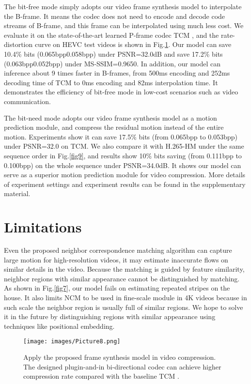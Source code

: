\documentclass[sigconf]{acmart}
\begin{document}
The bit-free mode simply adopts our video frame synthesis model to interpolate the B-frame. It means the codec does not need to encode and decode code streams of B-frame, and this frame can be interpolated using much less cost. We evaluate it on the state-of-the-art learned P-frame codec TCM  \cite{sheng2021temporal}, and the rate-distortion curve on HEVC test videos \cite{sullivan2012overview} is shown in Fig.\ref{fig8}. Our model can save 10.4\% bits (0.065bpp0.058bpp) under PSNR=32.0dB and save 17.2\% bits (0.063bpp0.052bpp) under MS-SSIM=0.9650. In addition, our model can inference about 9 times faster in B-frames, from 500ms encoding and 252ms decoding time of TCM to 0ms encoding and 82ms interpolation time. It demonstrates the efficiency of bit-free mode in low-cost scenarios such as video communication.

The bit-need mode adopts our video frame synthesis model as a motion prediction module, and compress the residual motion instead of the entire motion. Experiments show it can save 17.5\% bits (from 0.065bpp to 0.053bpp) under PSNR=32.0 on TCM. We also compare it with H.265-HM \cite{HM} under the same sequence order in Fig.\ref{fig9}, and results show 10\% bits saving (from 0.111bpp to 0.100bpp) on the whole sequence under PSNR=34.0dB. It shows our model can serve as a superior motion prediction module for video compression. More details of experiment settings and experiment results can be found in the supplementary material. 


\section{Limitations}

Even the proposed neighbor correspondence matching algorithm can capture large motion for high-resolution videos, it may estimate inaccurate flows on similar details in the video. Because the matching is guided by feature similarity, neighbor regions with similar appearance cannot be distinguished by matching. As shown in Fig.\ref{fig7}, our model fails on estimating repeated stripes on the house. It also limits NCM to be used in fine-scale module in 4K videos because in such scale the neighbor region is usually full of similar regions. We hope to solve it in the future by distinguishing regions with similar appearance using techniques like positional embedding.


\begin{figure}[t]
    \texttt{[image: images/Picture8.png]}
    \caption{Apply the proposed frame synthesis model in video compression. The designed plugin-and-in bi-directional codec can achieve higher compression rate compared with the baseline TCM  \cite{sheng2021temporal}. }
    \label{fig8}
\end{figure}
\end{document}

